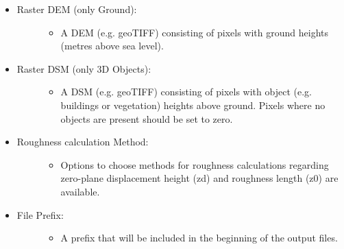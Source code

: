 \documentclass[letterpaper,10pt,english]{sphinxmanual}
\begin{document}
\begin{itemize}
\begin{description}
\begin{itemize}
\end{itemize}

\end{description}

\item {} \begin{description}
\item[{Raster DEM (only Ground):}] \leavevmode\begin{itemize}
\item {} 
A DEM (e.g. geoTIFF) consisting of pixels with ground heights (metres above sea level).

\end{itemize}

\end{description}

\item {} \begin{description}
\item[{Raster DSM (only 3D Objects):}] \leavevmode\begin{itemize}
\item {} 
A DSM (e.g. geoTIFF) consisting of pixels with object (e.g. buildings or vegetation) heights above ground. Pixels where no objects are present should be set to zero.

\end{itemize}

\end{description}

\item {} \begin{description}
\item[{Roughness calculation Method:}] \leavevmode\begin{itemize}
\item {} 
Options to choose methods for roughness calculations regarding zero-plane displacement height (zd) and roughness length (z0) are available.

\end{itemize}

\end{description}

\item {} \begin{description}
\item[{File Prefix:}] \leavevmode\begin{itemize}
\item {} 
A prefix that will be included in the beginning of the output files.


\end{itemize}
\end{description}
\end{itemize}
\end{document}
